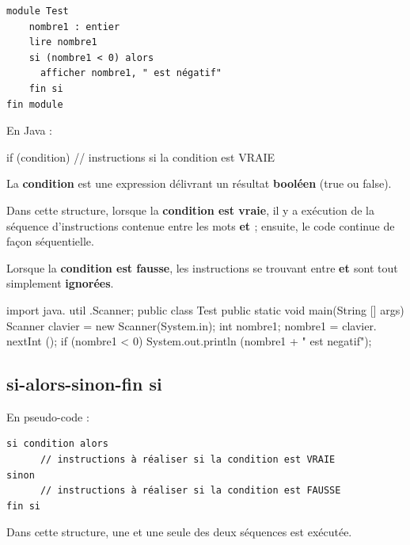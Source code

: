 \documentclass[11pt,a4paper]{article}
\begin{document}
            \par
        \begin{verbatim}
module Test
    nombre1 : entier
    lire nombre1 
    si (nombre1 < 0) alors
      afficher nombre1, " est négatif"
    fin si
fin module
    \end{verbatim}En Java :
            \par
        \begin{Java}
if (condition) { 
      // instructions si la condition est VRAIE
}
      \end{Java}
        La \textbf{condition} est une expression d\'elivrant un r\'esultat 
        \textbf{bool\'een} (true ou false).
      
            \par
        
        Dans cette structure, lorsque la \textbf{condition est vraie}, il y a ex\'ecution 
        de la s\'equence d'instructions contenue entre les mots \textbf{{} 
        et \textbf{}} ; ensuite, le code continue de fa\c con s\'equentielle.
      
            \par
        
        Lorsque la \textbf{condition est fausse}, 
        les instructions se trouvant entre \textbf{{} 
        et \textbf{}} sont tout simplement \textbf{ignor\'ees}.
      
            \par
        \begin{Java}
import java. util .Scanner;
public class Test {
    public static void main(String [] args) {
      Scanner clavier = new Scanner(System.in);
      int nombre1;
      nombre1 = clavier. nextInt ();
      if (nombre1 < 0) {
        System.out.println (nombre1 + " est negatif");
      }
    }
}
    \end{Java}\subsection{si-alors-sinon-fin si}En pseudo-code :
            \par
        \begin{verbatim}
si condition alors
      // instructions à réaliser si la condition est VRAIE
sinon
      // instructions à réaliser si la condition est FAUSSE
fin si
      \end{verbatim}
        Dans cette structure, une et une seule des deux s\'equences est ex\'ecut\'ee.
      
\end{document}
